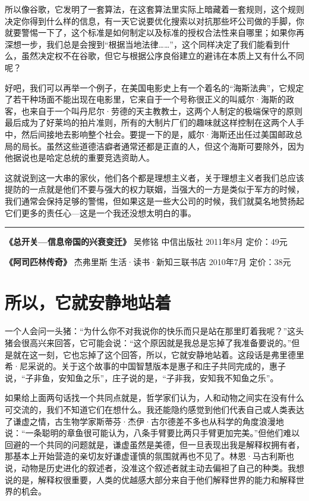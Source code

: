所以像谷歌，它发明了一套算法，在这套算法里实际上暗藏着一套规则，这个规则决定你得到什么样的信息，有一天它说要优化搜索以对抗那些坏公司做的手脚，你就要警惕一下了，这个标准是如何制定以及标准的授权合法性来自哪里；如果你再深想一步，我们总是会搜到``根据当地法律\ldots\ldots''，这个同样决定了我们能看到什么，虽然决定权不在谷歌，但它与根据公序良俗建立的避讳在本质上又有什么不同呢？

好吧，我们可以再举一个例子，在美国电影史上有一个着名的``海斯法典''，它规定了若干种场面不能出现在电影里，它来自于一个号称很正义的叫威尔·海斯的政客，也来自于一个叫丹尼尔·劳德的天主教教士，这两个人制定的极端保守的原则最后成为了好莱坞的拍片准则，所有的大制片厂们的趣味就这样控制在这两个人手中，然后间接地去影响整个社会。要提一下的是，威尔·海斯还出任过美国邮政总局的局长。虽然这些道德洁癖者通常还都是正直的人，但这个海斯可要除外，因为他据说也是哈定总统的重要竞选资助人。

这就说到这一大串的家伙，他们各个都是理想主义者，关于理想主义者我们总应该提防的一点就是他们不要与强大的权力联姻，当强大的一方是类似于军方的时候，我们通常会保持足够的警惕，但如果这是一些大公司的时候，我们就莫名地赞扬起它们更多的责任心---这是一个我还没想太明白的事。

\begin{center}\rule{0.5\linewidth}{0.5pt}\end{center}

\textbf{《总开关---信息帝国的兴衰变迁》} 吴修铭 中信出版社 2011年8月
定价：49元

\textbf{《阿司匹林传奇》} 杰弗里斯 生活·读书·新知三联书店 2010年7月
定价：38元

\hypertarget{ux6240ux4ee5ux5b83ux5c31ux5b89ux9759ux5730ux7ad9ux7740}{%
\section{所以，它就安静地站着}\label{ux6240ux4ee5ux5b83ux5c31ux5b89ux9759ux5730ux7ad9ux7740}}

一个人会问一头猪：``为什么你不对我说你的快乐而只是站在那里盯着我呢？''这头猪会很高兴来回答，它可能会说：``这个原因就是我总是忘掉了我准备要说的。''但是就在这一刻，它也忘掉了这个回答，所以，它就安静地站着。这段话是弗里德里希·尼采说的。关于这个故事的中国智慧版本是惠子和庄子共同完成的，惠子说，``子非鱼，安知鱼之乐''，庄子说的是，``子非我，安知我不知鱼之乐''。

如果给上面两句话找一个共同点就是，哲学家们认为，人和动物之间实在没有什么可交流的，我们不知道它们在想什么。我还能隐约感觉到他们代表自己或人类表达了谦虚之情，古生物学家斯蒂芬·杰伊·古尔德差不多也从科学的角度浪漫地说：``一条聪明的章鱼很可能认为，八条手臂要比两只手臂更加完美。''但他们难以回避的一个共同的问题就是，谦虚虽然是美德，但一旦表现出我是解释权拥有者，那基本上开始营造的亲切友好谦虚谨慎的氛围就再也不见了。林恩·马古利斯也说，动物是历史进化的叙述者，没准这个叙述者就主动去偏袒了自己的种类。我想说的是，解释权很重要，人类的优越感大部分来自于他们解释世界的能力和解释世界的机会。

